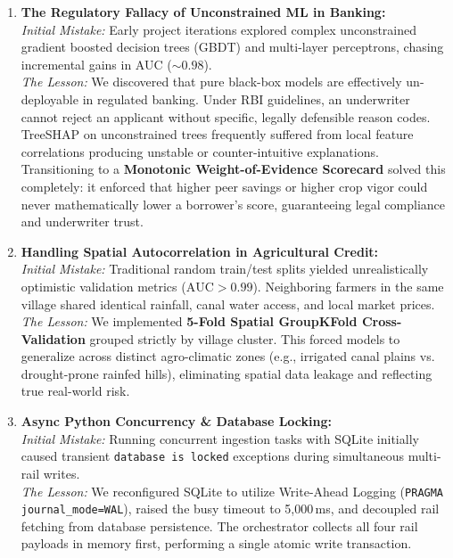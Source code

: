 \documentclass[11pt,a4paper,oneside]{report}
\begin{document}
\begin{enumerate}
  \item \textbf{The Regulatory Fallacy of Unconstrained ML in Banking:}\\
  \textit{Initial Mistake:} Early project iterations explored complex unconstrained gradient boosted decision trees (GBDT) and multi-layer perceptrons, chasing incremental gains in AUC ($\sim 0.98$).\\
  \textit{The Lesson:} We discovered that pure black-box models are effectively un-deployable in regulated banking. Under RBI guidelines, an underwriter cannot reject an applicant without specific, legally defensible reason codes. TreeSHAP on unconstrained trees frequently suffered from local feature correlations producing unstable or counter-intuitive explanations. Transitioning to a \textbf{Monotonic Weight-of-Evidence Scorecard} solved this completely: it enforced that higher peer savings or higher crop vigor could never mathematically lower a borrower's score, guaranteeing legal compliance and underwriter trust.

  \item \textbf{Handling Spatial Autocorrelation in Agricultural Credit:}\\
  \textit{Initial Mistake:} Traditional random train/test splits yielded unrealistically optimistic validation metrics ($\text{AUC} > 0.99$). Neighboring farmers in the same village shared identical rainfall, canal water access, and local market prices.\\
  \textit{The Lesson:} We implemented \textbf{5-Fold Spatial GroupKFold Cross-Validation} grouped strictly by village cluster. This forced models to generalize across distinct agro-climatic zones (e.g., irrigated canal plains vs. drought-prone rainfed hills), eliminating spatial data leakage and reflecting true real-world risk.

  \item \textbf{Async Python Concurrency \& Database Locking:}\\
  \textit{Initial Mistake:} Running concurrent ingestion tasks with SQLite initially caused transient \texttt{database is locked} exceptions during simultaneous multi-rail writes.\\
  \textit{The Lesson:} We reconfigured SQLite to utilize Write-Ahead Logging (\texttt{PRAGMA journal\_mode=WAL}), raised the busy timeout to 5,000\,ms, and decoupled rail fetching from database persistence. The orchestrator collects all four rail payloads in memory first, performing a single atomic write transaction.


\end{enumerate}
\end{document}
